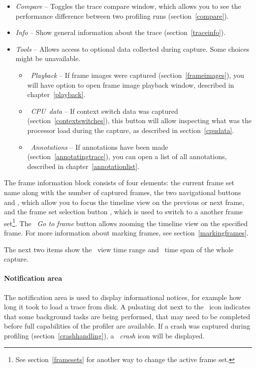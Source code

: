 \documentclass[hidelinks,titlepage,a4paper]{article}
\begin{document}
\begin{itemize}
\item \emph{\faBalanceScale{} Compare} -- Toggles the trace compare window, which allows you to see the performance difference between two profiling runs (section~\ref{compare}).
\item \emph{\faFingerprint{} Info} -- Show general information about the trace (section~\ref{traceinfo}).
\item \emph{\faTools{} Tools} -- Allows access to optional data collected during capture. Some choices might be unavailable.
\begin{itemize}
\item \emph{\faPlay{}~Playback} -- If frame images were captured (section~\ref{frameimages}), you will have option to open frame image playback window, described in chapter~\ref{playback}.
\item \emph{\faSlidersH{}~CPU~data} -- If context switch data was captured (section~\ref{contextswitches}), this button will allow inspecting what was the processor load during the capture, as described in section~\ref{cpudata}.
\item \emph{\faStickyNote{}~Annotations} -- If annotations have been made (section~\ref{annotatingtrace}), you can open a list of all annotations, described in chapter~\ref{annotationlist}.
\end{itemize}
\end{itemize}

The frame information block consists of four elements: the current frame set name along with the number of captured frames, the two navigational buttons \faCaretLeft{} and \faCaretRight{}, which allow you to focus the timeline view on the previous or next frame, and the frame set selection button \faCaretDown{}, which is used to switch to a another frame set\footnote{See section~\ref{framesets} for another way to change the active frame set.}. The \emph{\faCrosshairs{}~Go to frame} button allows zooming the timeline view on the specified frame. For more information about marking frames, see section~\ref{markingframes}.

The next two items show the \faEye{}~view time range and \faDatabase{}~time span of the whole capture.

\paragraph{Notification area}

The notification area is used to display informational notices, for example how long it took to load a trace from disk. A pulsating dot next to the \faTasks~icon indicates that some background tasks are being performed, that may need to be completed before full capabilities of the profiler are available. If a crash was captured during profiling (section~\ref{crashhandling}), a \emph{\faSkull{}~crash} icon will be displayed.
\end{document}
